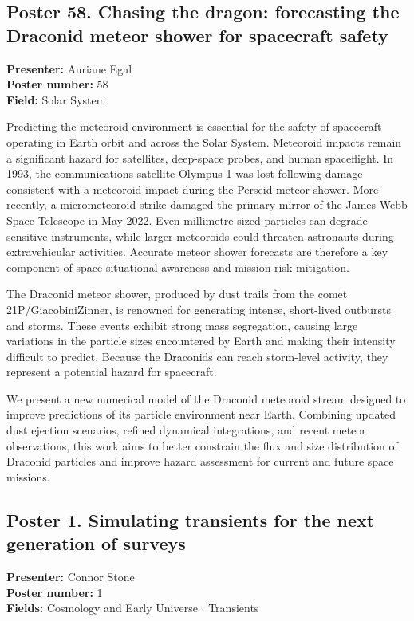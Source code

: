 \hypertarget{poster-abstract-talk-182}{}\label{poster-abstract-page-talk-182}
\subsection*{Poster 58. Chasing the dragon: forecasting the Draconid meteor shower for spacecraft safety}
\textbf{Presenter:} Auriane Egal\\
\textbf{Poster number:} 58\\
\textbf{Field:} Solar System

Predicting the meteoroid environment is essential for the safety of spacecraft operating in Earth orbit and across the Solar System. Meteoroid impacts remain a significant hazard for satellites, deep-space probes, and human spaceflight. In 1993, the communications satellite Olympus-1 was lost following damage consistent with a meteoroid impact during the Perseid meteor shower. More recently, a micrometeoroid strike damaged the primary mirror of the James Webb Space Telescope in May 2022. Even millimetre-sized particles can degrade sensitive instruments, while larger meteoroids could threaten astronauts during extravehicular activities. Accurate meteor shower forecasts are therefore a key component of space situational awareness and mission risk mitigation.

The Draconid meteor shower, produced by dust trails from the comet 21P/GiacobiniZinner, is renowned for generating intense, short-lived outbursts and storms. These events exhibit strong mass segregation, causing large variations in the particle sizes encountered by Earth and making their intensity difficult to predict. Because the Draconids can reach storm-level activity, they represent a potential hazard for spacecraft.

We present a new numerical model of the Draconid meteoroid stream designed to improve predictions of its particle environment near Earth. Combining updated dust ejection scenarios, refined dynamical integrations, and recent meteor observations, this work aims to better constrain the flux and size distribution of Draconid particles and improve hazard assessment for current and future space missions.


\hypertarget{poster-abstract-talk-27}{}\label{poster-abstract-page-talk-27}
\subsection*{Poster 1. Simulating transients for the next generation of surveys}
\textbf{Presenter:} Connor Stone\\
\textbf{Poster number:} 1\\
\textbf{Fields:} Cosmology and Early Universe $\cdot$ Transients


